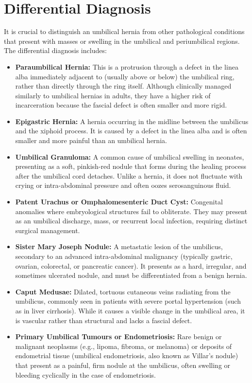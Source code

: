 \section*{Differential Diagnosis}
It is crucial to distinguish an umbilical hernia from other pathological conditions that present with masses or swelling in the umbilical and periumbilical regions. The differential diagnosis includes:
\begin{itemize}
    \item \textbf{Paraumbilical Hernia:} This is a protrusion through a defect in the linea alba immediately adjacent to (usually above or below) the umbilical ring, rather than directly through the ring itself. Although clinically managed similarly to umbilical hernias in adults, they have a higher risk of incarceration because the fascial defect is often smaller and more rigid.
    \item \textbf{Epigastric Hernia:} A hernia occurring in the midline between the umbilicus and the xiphoid process. It is caused by a defect in the linea alba and is often smaller and more painful than an umbilical hernia.
    \item \textbf{Umbilical Granuloma:} A common cause of umbilical swelling in neonates, presenting as a soft, pinkish-red nodule that forms during the healing process after the umbilical cord detaches. Unlike a hernia, it does not fluctuate with crying or intra-abdominal pressure and often oozes serosanguinous fluid.
    \item \textbf{Patent Urachus or Omphalomesenteric Duct Cyst:} Congenital anomalies where embryological structures fail to obliterate. They may present as an umbilical discharge, mass, or recurrent local infection, requiring distinct surgical management.
    \item \textbf{Sister Mary Joseph Nodule:} A metastatic lesion of the umbilicus, secondary to an advanced intra-abdominal malignancy (typically gastric, ovarian, colorectal, or pancreatic cancer). It presents as a hard, irregular, and sometimes ulcerated nodule, and must be differentiated from a benign hernia.
    \item \textbf{Caput Medusae:} Dilated, tortuous cutaneous veins radiating from the umbilicus, commonly seen in patients with severe portal hypertension (such as in liver cirrhosis). While it causes a visible change in the umbilical area, it is vascular rather than structural and lacks a fascial defect.
    \item \textbf{Primary Umbilical Tumours or Endometriosis:} Rare benign or malignant neoplasms (e.g., lipoma, fibroma, or melanoma) or deposits of endometrial tissue (umbilical endometriosis, also known as Villar's nodule) that present as a painful, firm nodule at the umbilicus, often swelling or bleeding cyclically in the case of endometriosis.
\end{itemize}

